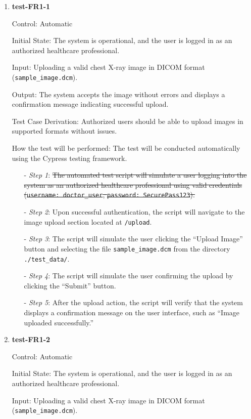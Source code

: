 \documentclass[12pt, titlepage]{article}
\begin{document}
\begin{enumerate}

\item \textbf{test-FR1-1} \label{test-FR1-1}

Control: Automatic

Initial State: The system is operational, and the user is logged in as an authorized healthcare professional.

Input: Uploading a valid chest X-ray image in DICOM format (\texttt{sample\_image.dcm}).

Output: The system accepts the image without errors and displays a confirmation message indicating successful upload.

Test Case Derivation: Authorized users should be able to upload images in supported formats without issues.

How the test will be performed: The test will be conducted automatically using the Cypress testing framework.
\begin{itemize}
  \item[-] \textit{Step 1}: \sout{The automated test script will simulate a user logging into the system as an authorized healthcare professional using valid credentials (\texttt{username: doctor\_user}, \texttt{password: SecurePass123}).}
  \item[-] \textit{Step 2}: Upon successful authentication, the script will navigate to the image upload section located at \texttt{/upload}.
  \item[-] \textit{Step 3}: The script will simulate the user clicking the ``Upload Image'' button and selecting the file \texttt{sample\_image.dcm} from the directory \texttt{./test\_data/}.
  \item[-] \textit{Step 4}: The script will simulate the user confirming the upload by clicking the ``Submit'' button.
  \item[-] \textit{Step 5}: After the upload action, the script will verify that the system displays a confirmation message on the user interface, such as ``Image uploaded successfully.''
  \end{itemize}


\item \textbf{test-FR1-2} \label{test-FR1-2}

Control: Automatic

Initial State: The system is operational, and the user is logged in as an authorized healthcare professional.

Input: Uploading a valid chest X-ray image in DICOM format (\texttt{sample\_image.dcm}).


\end{enumerate}
\end{document}
